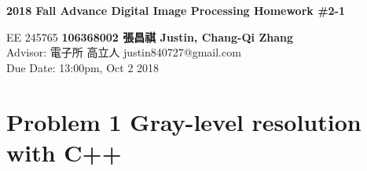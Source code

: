 \documentclass[a4paper, 11pt]{article}
\begin{document}
\noindent
\begin{center}
  \large\textbf{2018 Fall Advance Digital Image Processing Homework \#2-1} \\
\end{center}
\begin{CJK}{UTF8}{bsmi}
\normalsize EE 245765 \hfill \textbf{106368002 張昌祺 Justin, Chang-Qi Zhang} \\
Advisor: 電子所 高立人 \hfill justin840727@gmail.com \\
\null\hfill Due Date: 13:00pm, Oct 2 2018 \\
\end{CJK}

\section*{Problem 1 Gray-level resolution with C++}
\end{document}
